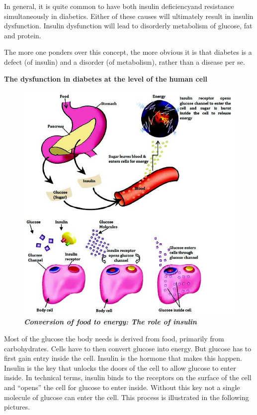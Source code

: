 In general, it is quite common to have both insulin deficiency\break and resistance simultaneously in diabetics. Either of these causes will ultimately result in insulin dysfunction. Insulin dysfunction will lead to disorderly metabolism of glucose, fat and protein.

The more one ponders over this concept, the more obvious it is that diabetes is a defect (of insulin) and a disorder (of metabolism), rather than a disease per se.

\noindent
\textbf{The dysfunction in diabetes at the level of the human cell}

\begin{figure}[h]
\centering
\includegraphics[scale=1.3]{images/019.jpg}\\
\textbf{\textit{Conversion of food to energy: The role of insulin}}
\end{figure}

Most of the glucose the body needs is derived from food, primarily from carbohydrates. Cells have to then convert glucose into energy. But glucose has to first gain entry inside the cell. Insulin is the hormone that makes this happen. Insulin is the key that unlocks the doors of the cell to allow glucose to enter inside. In technical terms, insulin binds to the receptors on the surface of the cell and “opens” the cell for glucose to enter inside. Without this key not a single molecule of glucose can enter the cell. This process is illustrated in the following pictures.


